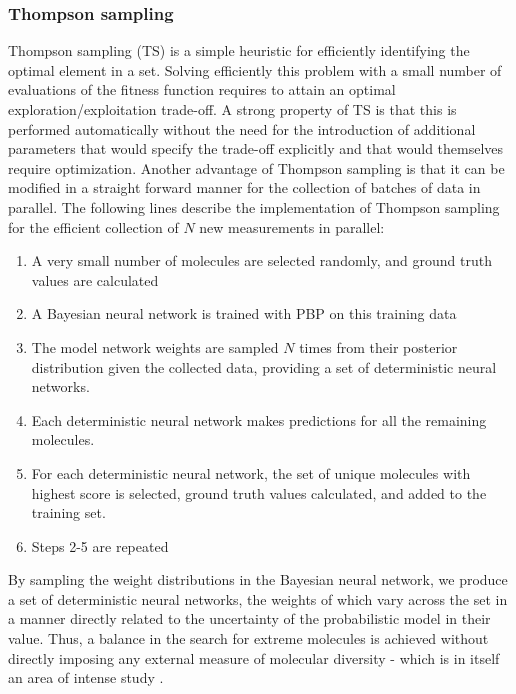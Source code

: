 \subsubsection{Thompson sampling}

Thompson sampling (TS) \cite{Thompson_1933} is a simple heuristic for efficiently identifying the optimal element in a set. Solving efficiently this problem with a small number of evaluations of the fitness function requires to attain an optimal exploration/exploitation trade-off. A strong property of TS  is that this is performed automatically without the need for the introduction of additional parameters that would specify the trade-off explicitly and that would themselves require optimization. Another advantage of Thompson sampling is that it can be modified in a straight forward manner for the collection of batches of data in parallel. The following lines describe the implementation of Thompson sampling for the efficient collection of $N$ new measurements in parallel:
\begin{enumerate}
\item A very small number of molecules are selected randomly, and ground truth values are calculated
\item A Bayesian neural network is trained with PBP on this training data
\item The model network weights are sampled $N$ times from their posterior distribution given the collected data, providing a set of deterministic neural networks.
\item Each deterministic neural network makes predictions for all the remaining molecules.
\item For each deterministic neural network, the set of unique molecules with highest score is selected, ground truth values calculated, and added to the training set.
\item Steps 2-5 are repeated
\end{enumerate}
By sampling the weight distributions in the Bayesian neural network, we produce a set of deterministic neural networks, the weights of which vary across the set in a manner directly related to the uncertainty of the probabilistic model in their value.  Thus, a balance in the search for extreme molecules is achieved without directly imposing any external measure of molecular diversity - which is in itself an area of intense study \cite{Maldonado_2006}.